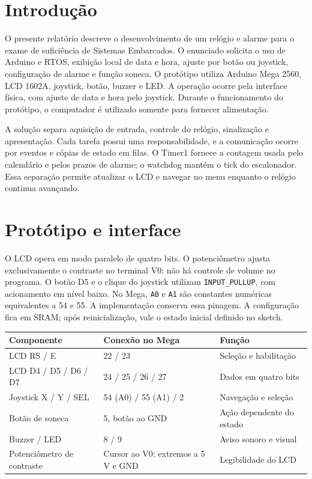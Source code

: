 \section{Introdução}

O presente relatório descreve o desenvolvimento de um relógio e alarme para o exame de suficiência de Sistemas Embarcados. O enunciado solicita o uso de Arduino e RTOS, exibição local de data e hora, ajuste por botão ou joystick, configuração de alarme e função soneca. O protótipo utiliza Arduino Mega 2560, LCD 1602A, joystick, botão, buzzer e LED. A operação ocorre pela interface física, com ajuste de data e hora pelo joystick. Durante o funcionamento do protótipo, o computador é utilizado somente para fornecer alimentação. \autocite{fonte1}

A solução separa aquisição de entrada, controle do relógio, sinalização e apresentação. Cada tarefa possui uma responsabilidade, e a comunicação ocorre por eventos e cópias de estado em filas. O Timer1 fornece a contagem usada pelo calendário e pelos prazos de alarme; o watchdog mantém o tick do escalonador. Essa separação permite atualizar o LCD e navegar no menu enquanto o relógio continua avançando.

\section{Protótipo e interface}

O LCD opera em modo paralelo de quatro bits. O potenciômetro ajusta exclusivamente o contraste no terminal V0: não há controle de volume no programa. O botão D5 e o clique do joystick utilizam \texttt{INPUT\_PULLUP}, com acionamento em nível baixo. No Mega, \texttt{A0} e \texttt{A1} são constantes numéricas equivalentes a 54 e 55. A implementação conserva essa pinagem. A configuração fica em SRAM; após reinicialização, vale o estado inicial definido no sketch.

\begin{center}\small
\begin{tabularx}{\textwidth}{@{}YYY@{}}\toprule

\textbf{Componente} & \textbf{Conexão no Mega} & \textbf{Função} \\ \midrule

LCD RS / E & 22 / 23 & Seleção e habilitação \\

LCD D4 / D5 / D6 / D7 & 24 / 25 / 26 / 27 & Dados em quatro bits \\

Joystick X / Y / SEL & 54 (A0) / 55 (A1) / 2 & Navegação e seleção \\

Botão de soneca & 5, botão ao GND & Ação dependente do estado \\

Buzzer / LED & 8 / 9 & Aviso sonoro e visual \\

Potenciômetro de contraste & Cursor ao V0; extremos a 5 V e GND & Legibilidade do LCD \\

\bottomrule\end{tabularx}
\end{center}

